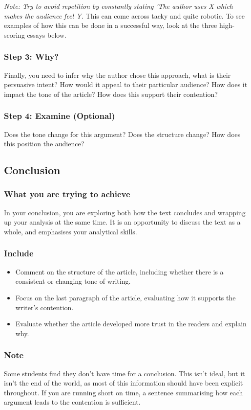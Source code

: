 \documentclass[a4paper]{article}
\begin{document}
\textit{Note: Try to avoid repetition by constantly stating 'The author uses X which makes the audience feel Y.} This can come across tacky and quite robotic. To see examples of how this can be done in a successful way, look at the three high-scoring essays below.\\

\subsubsection{Step 3: Why?}
Finally, you need to infer why the author chose this approach, what is their persuasive intent? How would it appeal to their particular audience? How does it impact the tone of the article? How does this support their contention?
\subsubsection{Step 4: Examine (Optional)}
Does the tone change for this argument? Does the structure change? How does this position the audience?

\newpage

\subsection{Conclusion}
\subsubsection{What you are trying to achieve}
In your conclusion, you are exploring both how the text concludes and wrapping up your analysis at the same time. It is an opportunity to discuss the text as a whole, and emphasises your analytical skills.

\subsubsection{Include}
\begin{itemize}
    \item Comment on the structure of the article, including whether there is a consistent or changing tone of writing.
    \item Focus on the last paragraph of the article, evaluating how it supports the writer's contention.
    \item Evaluate whether the article developed more trust in the readers and explain why.
\end{itemize}

\subsubsection{Note}
Some students find they don't have time for a conclusion. This isn't ideal, but it isn't the end of the world, as most of this information should have been explicit throughout. If you are running short on time, a sentence summarising how each argument leads to the  contention is sufficient.
\newpage
\end{document}
